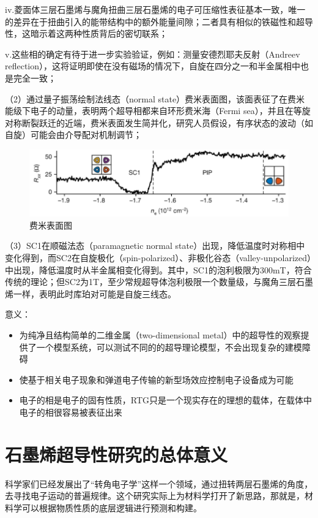 iv.菱面体三层石墨烯与魔角扭曲三层石墨烯的电子可压缩性表征基本一致，唯一的差异在于扭曲引入的能带结构中的额外能量间隙；二者具有相似的铁磁性和超导性，这暗示着这两种性质背后的密切联系；

v.这些相的确定有待于进一步实验验证，例如：测量安德烈耶夫反射（Andreev reflection），这将证明即使在没有磁场的情况下，自旋在四分之一和半金属相中也是完全一致；

（2）通过量子振荡绘制法线态（normal state）费米表面图，该面表征了在费米能级下电子的动量，表明两个超导相都来自环形费米海（Fermi sea），并且在等旋对称断裂跃迁的近端，费米表面发生简并化，研究人员假设，有序状态的波动（如自旋）可能会由介导配对机制调节；

\begin{figure}
    \centering
    \includegraphics[scale=0.4]{img/5.png}
    \caption{费米表面图}
\end{figure}

（3）SC1在顺磁法态（paramagnetic normal state）出现，降低温度时对称相中变化得到，而SC2在自旋极化（spin-polarized）、非极化谷态（valley-unpolarized）中出现，降低温度时从半金属相变化得到。其中，SC1的泡利极限为300mT，符合传统的理论；但SC2为1T，至少常规超导体泡利极限一个数量级，与魔角三层石墨烯一样，表明此时库珀对可能是自旋三线态。

意义：

\begin{itemize}
    \item 为纯净且结构简单的二维金属（two-dimensional metal）中的超导性的观察提供了一个模型系统，可以测试不同的的超导理论模型，不会出现复杂的建模障碍
    \item 使基于相关电子现象和弹道电子传输的新型场效应控制电子设备成为可能
    \item 电子的相是电子的固有性质，RTG只是一个现实存在的理想的载体，在载体中电子的相很容易被表征出来\cite{RN53,RN54}
\end{itemize}

\section{石墨烯超导性研究的总体意义}

科学家们已经发展出了“转角电子学”这样一个领域，通过扭转两层石墨烯的角度，去寻找电子运动的普遍规律。这个研究实际上为材料学打开了新思路，那就是，材料学可以根据物质性质的底层逻辑进行预测和构建。

